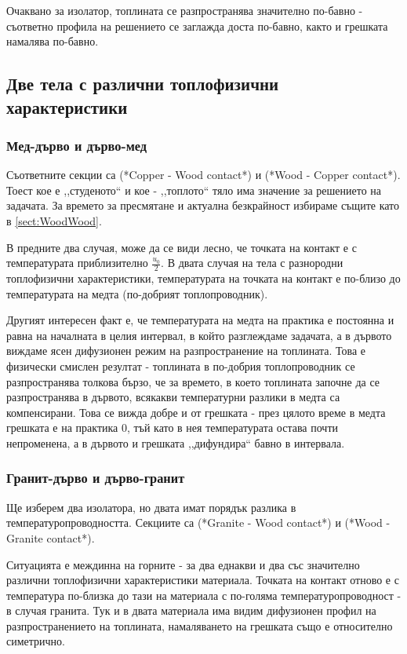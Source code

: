 Очаквано за изолатор, топлината се разпространява значително по-бавно - съответно профила на решението се заглажда доста по-бавно, както и грешката
намалява по-бавно.

\subsection{Две тела с различни топлофизични характеристики}

\subsubsection{Мед-дърво и дърво-мед}
Съответните секции са \textcolor{comment}{(*Copper - Wood contact*)} и \textcolor{comment}{(*Wood - Copper contact*)}. 
Тоест кое е ,,студеното`` и кое - ,,топлото`` тяло има значение за решението на задачата.
За времето за пресмятане и актуална безкрайност избираме същите като в \autoref{sect:WoodWood}. 

В предните два случая, може да се види лесно, че точката на контакт е с температурата приблизително $\frac{u_0}{2}$. В двата случая на тела с разнородни топлофизични характеристики,
температурата на точката на контакт е по-близо до температурата на медта (по-добрият топлопроводник). 

Другият интересен факт е, че температурата на медта на практика е постоянна и равна на началната в целия интервал, в който разглеждаме задачата, а в дървото виждаме ясен дифузионен режим на разпространение на топлината.
Това е физически смислен резултат - топлината в по-добрия топлопроводник се разпространява толкова бързо, че за времето, в което топлината започне да се разпространява
в дървото, всякакви температурни разлики в медта са компенсирани.
Това се вижда добре и от грешката - през цялото време в медта грешката е на практика 0, тъй като в нея температурата остава почти непроменена, а в дървото и грешката ,,дифундира`` бавно в интервала.

\subsubsection{Гранит-дърво и дърво-гранит}
Ще изберем два изолатора, но двата имат порядък разлика в температуропроводността. Секциите са \textcolor{comment}{(*Granite - Wood contact*)} и \textcolor{comment}{(*Wood - Granite contact*)}.

Ситуацията е междинна на горните - за два еднакви и два със значително различни топлофизични характеристики материала. Точката на контакт отново е с температура по-близка до тази на материала с по-голяма температуропроводност - в случая гранита.
Тук и в двата материала има видим дифузионен профил на разпространението на топлината, намаляването на грешката също е относително симетрично. 

